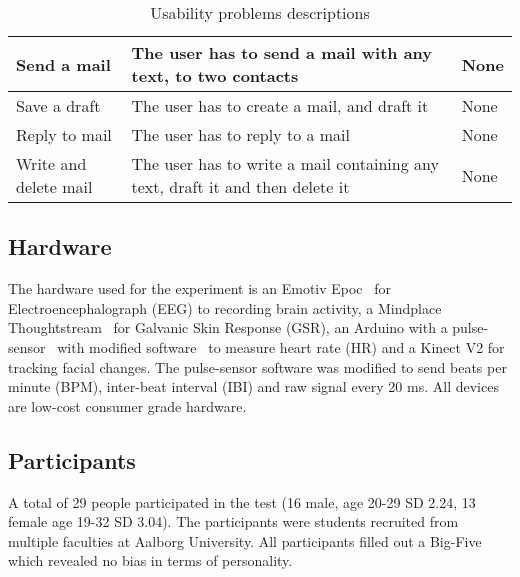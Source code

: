 \begin{table}[h]
\begin{tabular}[c]{|l|p{80pt}|p{80pt}|}
    \small{Send a mail}           & \small{The user has to send a mail with any text, to two contacts}                                                                             & \small{None}                                                                                             \\ \hline
    \small{Save a draft}          & \small{The user has to create a mail, and draft it}                                                                                            & \small{None}                                                                                             \\ \hline
    \small{Reply to mail}         & \small{The user has to reply to a mail}                                                                                                        & \small{None}                                                                                             \\ \hline
    \small{Write and delete mail} & \small{The user has to write a mail containing any text, draft it and then delete it}                                                          & \small{None}                                                                                             \\ \hline
  \end{tabular}
  \caption{Usability problems descriptions}
  \label{tab:ups-desc}
\end{table}

\subsection{Hardware}
The hardware used for the experiment is an Emotiv Epoc~\cite{emotiv_epoc_website} for Electroencephalograph (EEG) to recording brain activity, a Mindplace Thoughtstream~\cite{thoughtstream} for Galvanic Skin Response (GSR), an Arduino with a pulse-sensor~\cite{pulsesensor} with modified software~\cite{pulsesensorgit} to measure heart rate (HR) and a Kinect V2\cite{kinect_specs3} for tracking facial changes.
The pulse-sensor software was modified to send beats per minute (BPM), inter-beat interval (IBI) and raw signal every 20 ms.
All devices are low-cost consumer grade hardware.

\subsection{Participants}
A total of 29 people participated in the test (16 male, age 20-29 SD 2.24, 13 female age 19-32 SD 3.04).
The participants were students recruited from multiple faculties at Aalborg University. 
All participants filled out a Big-Five\cite{big5} which revealed no bias in terms of personality.
